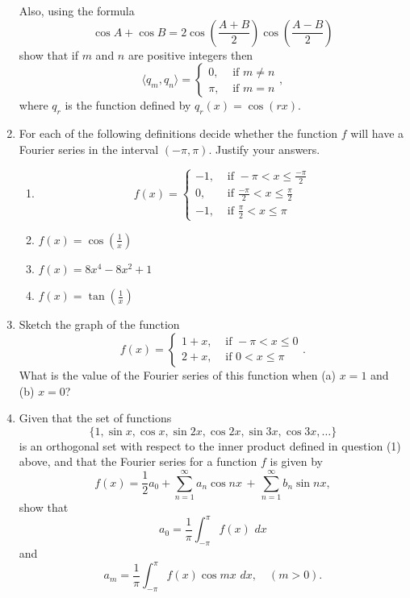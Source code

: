 \documentclass[a4paper]{amsart}
\begin{document}
\begin{enumerate}
  Also, using the formula
  $$\cos A + \cos B = 2 \cos \left (\frac{A+B}{2} \right ) \cos \left (\frac{A-B}{2} \right ) $$
  show that if $m$ and $n$ are positive integers then 
  $$ \langle q_m , q_n \rangle = 
  \left\{
       \begin{array}{lr}
         0, &  \text{ if } m \neq n\\
         \pi, & \text{ if } m = n 
       \end{array}
     \right. ,$$
  where $q_r$ is the function defined by $q_r(x) = \cos (rx)$.
  \item
  For each of the following definitions decide whether the function $f$ will have a Fourier series in the interval $(-\pi, \pi)$. Justify your answers. 
  \begin{enumerate}
  \item
  $$f(x)=\left\{
       \begin{array}{rl}
         -1, &  \text{ if } -\pi < x \leq \frac{-\pi}{2}\\
         0, & \text{ if } \frac{-\pi}{2} < x \leq \frac{\pi}{2} \\
           -1, &  \text{ if } \frac{\pi}{2} < x \leq \pi
       \end{array}
     \right.$$
  \item
  $f(x) = \cos \left ( \frac{1}{x} \right )$
  \item
  $f(x)=8x^4 - 8x^2 + 1$
  \item
  $f(x) = \tan \left ( \frac{1}{x} \right )$
  \end{enumerate}
  \item
  Sketch the graph of the function 
  $$f(x)=\left\{
       \begin{array}{rl}
         1+x, &  \text{ if } -\pi < x \leq 0\\
         2+x, & \text{ if } 0 < x \leq \pi
       \end{array}
     \right. .$$
  What is the value of the Fourier series of this function when (a) $x=1$ and (b) $x=0$?
  \item
  Given that the set of functions
  $$ \{ 1, \sin x, \cos x, \sin 2x , \cos 2x, \sin 3x, \cos 3x , \dots \}$$
  is an orthogonal set with respect to the inner product defined in question (1) above, and that the Fourier series for a function $f$ is given by 
  $$f(x) = \frac{1}{2} a_0 + \sum_{n=1}^\infty a_n \cos nx \, + \, \sum_{n=1}^\infty b_n \sin nx ,$$
  show that 
  $$a_0 = \frac{1}{\pi} \int_{-\pi}^\pi f(x) \, \, dx $$
  and 
  $$ a_m = \frac{1}{\pi} \int_{-\pi}^\pi f(x) \cos mx \, \, dx , \quad (m >0) .$$



\end{enumerate}
\end{document}
